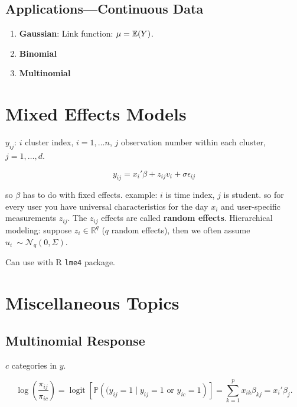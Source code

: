 \subsection{Applications---Continuous Data}

\begin{enumerate}

\item \textbf{Gaussian}: Link function: \(\mu = \mathbb{E}(Y)\).

\item \textbf{Binomial} 

\item \textbf{Multinomial}

\end{enumerate}

\section{Mixed Effects Models}


\(y_{ij}\): \(i\) cluster index, \(i = 1, \ldots n\), \(j\) observation number within each cluster, \(j = 1, \ldots ,d \).

\[
y_{ij} = x_i' \beta + z_{ij} v_i + \sigma \epsilon_{ij}
\]

so \(\beta\) has to do with fixed effects. example: \(i\) is time index, \(j\) is student. so for every user you have universal characteristics for the day \(x_i\) and user-specific measurements \(z_{ij}\). The \(z_{ij}\) effects are called \textbf{random effects}. Hierarchical modeling: suppose \(z_i \in \mathbb{R}^q\) (\(q\) random effects), then we often assume \(u_i\ \sim \mathcal{N}_q(0, \Sigma)\).

Can use with R \texttt{lme4} package.

\section{Miscellaneous Topics}

\subsection{Multinomial Response}

\(c\) categories in \(y\).

\[
\log \left( \frac{\pi_{ij}}{\pi_{ic}} \right) = \operatorname{logit} \left[ \mathbb{P} \left( (y_{ij} = 1 \mid y_{ij} = 1 \text{ or } y_{ic} = 1\right)  \right] = \sum_{k=1}^p x_{ik} \beta_{kj} = x_i' \beta_j.
\]

